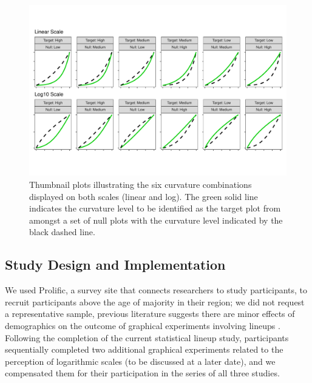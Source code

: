 \documentclass[12pt]{article}
\begin{document}
\begin{figure}[tbp]

{\centering \includegraphics[width=1\linewidth,]{logarithmic-lineups_files/figure-latex/curvature-combination-example-1} 

}

\caption[Lineup curvature combinations]{Thumbnail plots illustrating the six curvature combinations displayed on both scales (linear and log). The green solid line indicates the curvature level to be identified as the target plot from amongst a set of null plots with the curvature level indicated by the black dashed line.}\label{fig:curvature-combination-example}
\end{figure}

\hypertarget{study-design-and-implementation}{%
\subsection{Study Design and
Implementation}\label{study-design-and-implementation}}

We used Prolific, a survey site that connects researchers to study
participants, to recruit participants above the age of majority in their
region; we did not request a representative sample, previous literature
suggests there are minor effects of demographics on the outcome of
graphical experiments involving lineups
\citep{vanderplas2015spatial, majumder_validation_2013}. Following the
completion of the current statistical lineup study, participants
sequentially completed two additional graphical experiments related to
the perception of logarithmic scales (to be discussed at a later date),
and we compensated them for their participation in the series of all
three studies.
\end{document}
